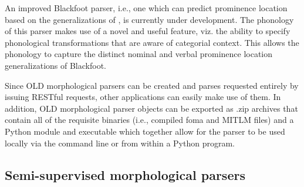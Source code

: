 \documentclass[11pt]{article}
\newcommand{\smalltodo}[2][]
    {\todo[caption={#2}, #1]
    {\tiny#2\normalsize}}
\begin{document}
An improved Blackfoot parser, i.e., one which can predict prominence location
based on the generalizations of \cite{weber2013}, is currently under
development. The phonology of this parser makes use of a novel and useful
feature, viz. the ability to specify phonological transformations that are
aware of categorial context. This allows the phonology to capture the distinct
nominal and verbal prominence location generalizations of Blackfoot.

Since OLD morphological parsers can be created and parses requested entirely by
issuing RESTful requests, other applications can easily make use of them. In
addition, OLD morphological parser objects can be exported as .zip archives
that contain all of the requisite binaries (i.e., compiled foma and MITLM
files) and a Python module and executable which together allow for the parser
to be used locally via the command line or from within a Python program.






\subsection{Semi-supervised morphological parsers}
 \label{sec:lingsync-glosser} 

%
\end{document}
